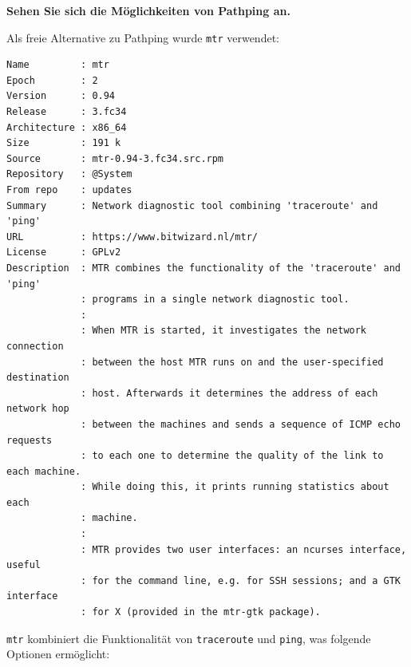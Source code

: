 \textbf{Sehen Sie sich die Möglichkeiten von Pathping an.}

Als freie Alternative zu Pathping wurde \texttt{mtr} verwendet:

\begin{verbatim}
Name         : mtr
Epoch        : 2
Version      : 0.94
Release      : 3.fc34
Architecture : x86_64
Size         : 191 k
Source       : mtr-0.94-3.fc34.src.rpm
Repository   : @System
From repo    : updates
Summary      : Network diagnostic tool combining 'traceroute' and 'ping'
URL          : https://www.bitwizard.nl/mtr/
License      : GPLv2
Description  : MTR combines the functionality of the 'traceroute' and 'ping'
             : programs in a single network diagnostic tool.
             :
             : When MTR is started, it investigates the network connection
             : between the host MTR runs on and the user-specified destination
             : host. Afterwards it determines the address of each network hop
             : between the machines and sends a sequence of ICMP echo requests
             : to each one to determine the quality of the link to each machine.
             : While doing this, it prints running statistics about each
             : machine.
             :
             : MTR provides two user interfaces: an ncurses interface, useful
             : for the command line, e.g. for SSH sessions; and a GTK interface
             : for X (provided in the mtr-gtk package).
\end{verbatim}

\texttt{mtr} kombiniert die Funktionalität von \texttt{traceroute} und
\texttt{ping}, was folgende Optionen ermöglicht:

